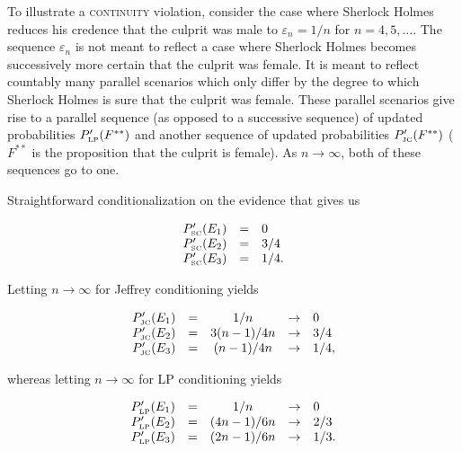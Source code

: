 \documentclass[11pt]{article}
\begin{document}
To illustrate a \textsc{continuity} violation, consider the case where
Sherlock Holmes reduces his credence that the culprit was male to
$\varepsilon_{n}=1/n$ for $n=4,5,\ldots$. The sequence
$\varepsilon_{n}$ is not meant to reflect a case where Sherlock Holmes
becomes successively more certain that the culprit was female. It is
meant to reflect countably many parallel scenarios which only differ
by the degree to which Sherlock Holmes is sure that the culprit was
female. These parallel scenarios give rise to a parallel sequence (as
opposed to a successive sequence) of updated probabilities
$P'_{\mbox{\tiny LP}}(F^{**})$ and another sequence of updated
probabilities $P'_{\mbox{\tiny JC}}(F^{**})$ ($F^{**}$ is the
proposition that the culprit is female). As $n\rightarrow\infty$, both
of these sequences go to one.

Straightforward conditionalization on the evidence that  gives us 

\begin{equation}
  \label{eq:sherlockcontsc}
  \begin{array}{rcl}
  P'_{\mbox{\tiny SC}}(E_{1})&=&0\\
  P'_{\mbox{\tiny SC}}(E_{2})&=&3/4\\
  P'_{\mbox{\tiny SC}}(E_{3})&=&1/4.
\end{array}
\end{equation}

Letting $n\rightarrow\infty$ for Jeffrey conditioning yields

\begin{equation}
  \label{eq:sherlockcontjc}
  \begin{array}{rcccl}
  P'_{\mbox{\tiny JC}}(E_{1})&=&1/n&\rightarrow&0\\
  P'_{\mbox{\tiny JC}}(E_{2})&=&3(n-1)/4n&\rightarrow&3/4\\
  P'_{\mbox{\tiny JC}}(E_{3})&=&(n-1)/4n&\rightarrow&1/4,
\end{array}
\end{equation}

whereas letting $n\rightarrow\infty$ for LP conditioning yields

\begin{equation}
  \label{eq:sherlockcontlp}
  \begin{array}{rcccl}
  P'_{\mbox{\tiny LP}}(E_{1})&=&1/n&\rightarrow&0\\
  P'_{\mbox{\tiny LP}}(E_{2})&=&(4n-1)/6n&\rightarrow&2/3\\
  P'_{\mbox{\tiny LP}}(E_{3})&=&(2n-1)/6n&\rightarrow&1/3.
\end{array}
\end{equation}
\end{document}
